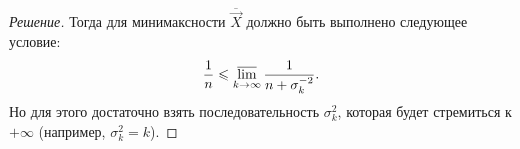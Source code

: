 \begin{proof}[Решение]
    Тогда для минимаксности $\overline{\vec{X}}$ должно быть выполнено следующее условие:
    \[
        \frac{1}{n} \leq \varlimsup_{k \to \infty} \frac{1}{n + \sigma_{k}^{-2}}.
    \]
    Но для этого достаточно взять последовательность $\sigma_{k}^{2}$, которая будет стремиться к $+\infty$ (например, $\sigma_{k}^{2} = k$).
\end{proof}

